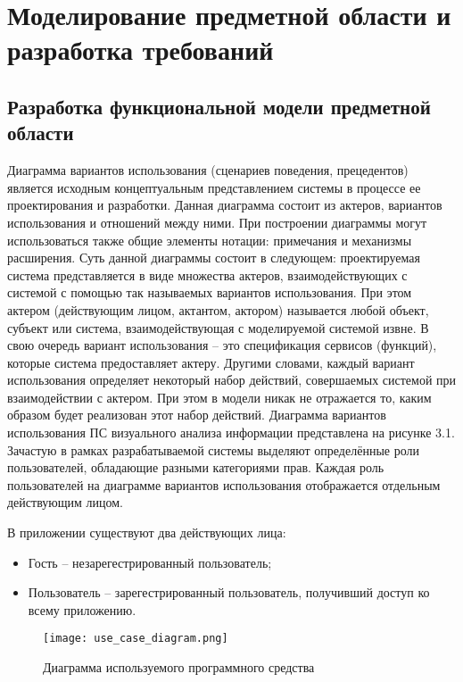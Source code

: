 \section{Моделирование предметной области и разработка требований}
\label{sec:func}
 
\subsection{Разработка функциональной модели предметной области}
Диаграмма вариантов использования (сценариев поведения, прецедентов) является исходным концептуальным представлением системы в процессе ее проектирования и разработки. Данная диаграмма состоит из актеров, вариантов использования и отношений между ними. При построении диаграммы могут использоваться также общие элементы нотации: примечания и механизмы расширения.
Суть данной диаграммы состоит в следующем: проектируемая система представляется в виде множества актеров, взаимодействующих с системой с помощью так называемых вариантов использования. При этом актером (действующим лицом, актантом, актором) называется любой объект, субъект или система, взаимодействующая с моделируемой системой извне. В свою очередь вариант использования – это спецификация сервисов (функций), которые система предоставляет актеру. Другими словами, каждый вариант использования определяет некоторый набор действий, совершаемых системой при взаимодействии с актером. При этом в модели никак не отражается то, каким образом будет реализован этот набор действий.
Диаграмма вариантов использования ПС визуального анализа информации представлена на рисунке 3.1.
Зачастую в рамках разрабатываемой системы выделяют определённые роли пользователей, обладающие разными категориями прав. Каждая роль пользователей на диаграмме вариантов использования отображается отдельным действующим лицом.

В приложении существуют два действующих лица:
\begin{itemize}
  \item Гость – незарегестрированный пользователь;
  \item Пользователь – зарегестрированный пользователь, получивший доступ ко всему приложению.
\end{itemize}

\begin{figure}[H]
 \centering
   \texttt{[image: use\_case\_diagram.png]} 
   \caption{Диаграмма используемого программного средства}
   \label{fig:domain:use_case_diagram}
\end{figure}


